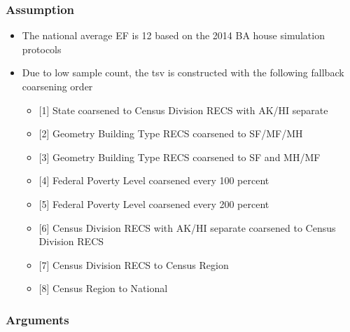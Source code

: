 \subsubsection{Assumption}\label{assumption-69}

\begin{itemize}
 
\item
  The national average EF is 12 based on the 2014 BA house simulation
  protocols
\item
  Due to low sample count, the tsv is constructed with the following
  fallback coarsening order

  \begin{itemize}
   
  \item
    {[}1{]} State coarsened to Census Division RECS with AK/HI separate
  \item
    {[}2{]} Geometry Building Type RECS coarsened to SF/MF/MH
  \item
    {[}3{]} Geometry Building Type RECS coarsened to SF and MH/MF
  \item
    {[}4{]} Federal Poverty Level coarsened every 100 percent
  \item
    {[}5{]} Federal Poverty Level coarsened every 200 percent
  \item
    {[}6{]} Census Division RECS with AK/HI separate coarsened to Census
    Division RECS
  \item
    {[}7{]} Census Division RECS to Census Region
  \item
    {[}8{]} Census Region to National
  \end{itemize}
\end{itemize}

\subsubsection{Arguments}\label{arguments-75}

